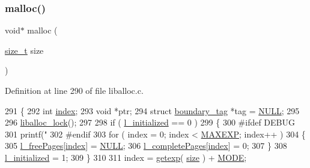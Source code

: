 \subsubsection{\texorpdfstring{malloc()}{malloc()}}
{\footnotesize\ttfamily void$\ast$ malloc (\begin{DoxyParamCaption}\item[{\hyperlink{a00026_a7c94ea6f8948649f8d181ae55911eeaf_a7c94ea6f8948649f8d181ae55911eeaf}{size\+\_\+t}}]{size }\end{DoxyParamCaption})}



Definition at line 290 of file liballoc.\+c.


\begin{DoxyCode}
291 \{
292     \textcolor{keywordtype}{int} \hyperlink{a00095_adfc426eed5361508d62c6e8f484bd270_adfc426eed5361508d62c6e8f484bd270}{index};
293     \textcolor{keywordtype}{void} *ptr;
294     \textcolor{keyword}{struct }\hyperlink{a00095}{boundary\_tag} *tag = \hyperlink{a00026_a070d2ce7b6bb7e5c05602aa8c308d0c4_a070d2ce7b6bb7e5c05602aa8c308d0c4}{NULL};
295 
296     \hyperlink{a00026_a8b5670e4594b0b6f8be78fe17f0c3b53_a8b5670e4594b0b6f8be78fe17f0c3b53}{liballoc\_lock}();
297 
298         \textcolor{keywordflow}{if} ( \hyperlink{a00023_a4aac6ed0ba0144598c5abe18222c3493_a4aac6ed0ba0144598c5abe18222c3493}{l\_initialized} == 0 )
299         \{
300 \textcolor{preprocessor}{            #ifdef DEBUG}
301             printf(\textcolor{stringliteral}{"%
302 \textcolor{preprocessor}{            #endif}
303             \textcolor{keywordflow}{for} ( index = 0; index < \hyperlink{a00023_af823bb7d083fafbd662be7ea09582013_af823bb7d083fafbd662be7ea09582013}{MAXEXP}; index++ )
304             \{
305                 \hyperlink{a00023_a78b8b6e448179d3cd64915f99fee60e0_a78b8b6e448179d3cd64915f99fee60e0}{l\_freePages}[\hyperlink{a00095_adfc426eed5361508d62c6e8f484bd270_adfc426eed5361508d62c6e8f484bd270}{index}] = \hyperlink{a00026_a070d2ce7b6bb7e5c05602aa8c308d0c4_a070d2ce7b6bb7e5c05602aa8c308d0c4}{NULL};
306                 \hyperlink{a00023_a213db3baf1d4b13d604015489247980d_a213db3baf1d4b13d604015489247980d}{l\_completePages}[\hyperlink{a00095_adfc426eed5361508d62c6e8f484bd270_adfc426eed5361508d62c6e8f484bd270}{index}] = 0;
307             \}
308             \hyperlink{a00023_a4aac6ed0ba0144598c5abe18222c3493_a4aac6ed0ba0144598c5abe18222c3493}{l\_initialized} = 1;
309         \}
310 
311         index = \hyperlink{a00023_ab5fc0b977bf14bdb99c8b87cae451d42_ab5fc0b977bf14bdb99c8b87cae451d42}{getexp}( \hyperlink{a00095_a29b056a39f6022d32468e7913e6df936_a29b056a39f6022d32468e7913e6df936}{size} ) + \hyperlink{a00023_ab8c52c1b4c021ed3e6b6b677bd2ac019_ab8c52c1b4c021ed3e6b6b677bd2ac019}{MODE};
}
\end{DoxyCode}
